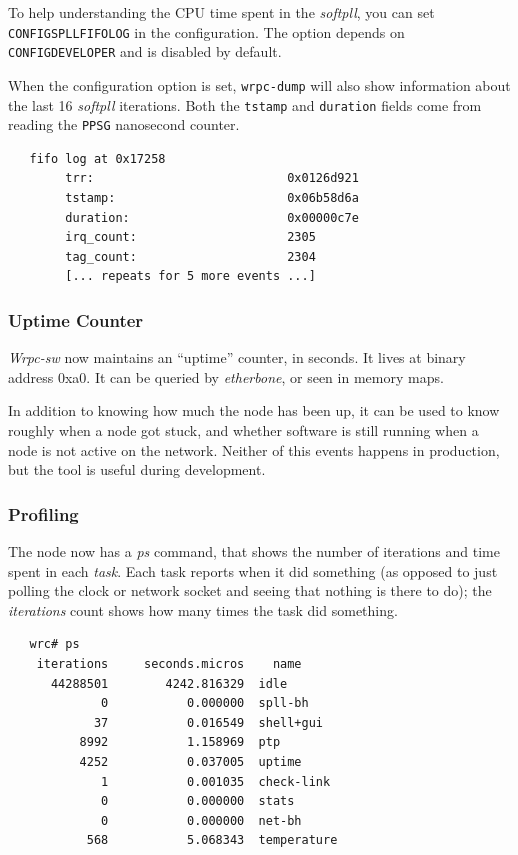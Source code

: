 \documentclass[a4paper, 12pt]{article}
\renewcommand{\_}{\underscore\allowbreak}
\begin{document}
To help understanding the CPU time spent in the \textit{softpll}, you can
set \texttt{CONFIG\_SPLL\_FIFO\_LOG} in the configuration. The option
depends on \texttt{CONFIG\_DEVELOPER} and is disabled by default.

When the configuration option is set, \texttt{wrpc-dump} will also show
information about the last 16 \textit{softpll} iterations. Both the \texttt{tstamp}
and \texttt{duration} fields come from reading the \texttt{PPSG} nanosecond counter.

\begin{lstlisting}
   fifo log at 0x17258
        trr:                           0x0126d921
        tstamp:                        0x06b58d6a
        duration:                      0x00000c7e
        irq_count:                     2305
        tag_count:                     2304
        [... repeats for 5 more events ...]
\end{lstlisting}

\subsubsection{Uptime Counter}
\label{Uptime Counter}

\textit{Wrpc-sw} now maintains an ``uptime'' counter, in seconds. It lives
at binary address 0xa0. It can be queried by \textit{etherbone}, or
seen in memory maps.

In addition to knowing how much the node has been up, it can be used to
know roughly when a node got stuck, and whether software is still
running when a node is not active on the network. Neither of this events
happens in production, but the tool is useful during development.

\subsubsection{Profiling}
\label{Profiling}

The node now has a \textit{ps} command, that shows the number of iterations
and time spent in each \textit{task}. Each task reports when it did
something (as opposed to just polling the clock or network socket and
seeing that nothing is there to do); the \textit{iterations} count shows how many
times the task did something.

\begin{lstlisting}
   wrc# ps
    iterations     seconds.micros    name
      44288501        4242.816329  idle
             0           0.000000  spll-bh
            37           0.016549  shell+gui
          8992           1.158969  ptp
          4252           0.037005  uptime
             1           0.001035  check-link
             0           0.000000  stats
             0           0.000000  net-bh
           568           5.068343  temperature
\end{lstlisting}
\end{document}
